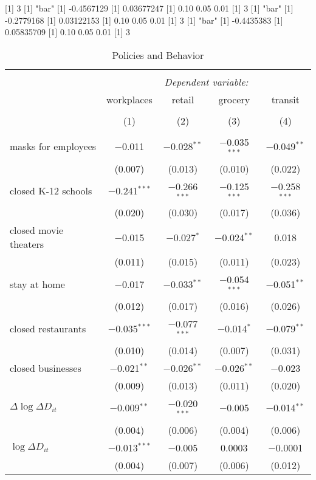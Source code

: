 [1] 3
[1] "bar"
[1] -0.4567129
[1] 0.03677247
[1] 0.10 0.05 0.01
[1] 3
[1] "bar"
[1] -0.2779168
[1] 0.03122153
[1] 0.10 0.05 0.01
[1] 3
[1] "bar"
[1] -0.4435383
[1] 0.05835709
[1] 0.10 0.05 0.01
[1] 3

\begin{table}[!htbp] \centering 
  \caption{Policies and Behavior} 
  \label{} 
\begin{tabular}{@{\extracolsep{1pt}}lcccc} 
\\[-1.8ex]\hline 
\hline \\[-1.8ex] 
 & \multicolumn{4}{c}{\textit{Dependent variable:}} \\ 
\cline{2-5} 
 & workplaces & retail & grocery & transit \\ 
\\[-1.8ex] & (1) & (2) & (3) & (4)\\ 
\hline \\[-1.8ex] 
 masks for employees & $-$0.011 & $-$0.028$^{**}$ & $-$0.035$^{***}$ & $-$0.049$^{**}$ \\ 
  & (0.007) & (0.013) & (0.010) & (0.022) \\ 
  closed K-12 schools & $-$0.241$^{***}$ & $-$0.266$^{***}$ & $-$0.125$^{***}$ & $-$0.258$^{***}$ \\ 
  & (0.020) & (0.030) & (0.017) & (0.036) \\ 
  closed movie theaters & $-$0.015 & $-$0.027$^{*}$ & $-$0.024$^{**}$ & 0.018 \\ 
  & (0.011) & (0.015) & (0.011) & (0.023) \\ 
  stay at home & $-$0.017 & $-$0.033$^{**}$ & $-$0.054$^{***}$ & $-$0.051$^{**}$ \\ 
  & (0.012) & (0.017) & (0.016) & (0.026) \\ 
  closed restaurants & $-$0.035$^{***}$ & $-$0.077$^{***}$ & $-$0.014$^{*}$ & $-$0.079$^{**}$ \\ 
  & (0.010) & (0.014) & (0.007) & (0.031) \\ 
  closed businesses & $-$0.021$^{**}$ & $-$0.026$^{**}$ & $-$0.026$^{**}$ & $-$0.023 \\ 
  & (0.009) & (0.013) & (0.011) & (0.020) \\ 
  $\Delta \log \Delta D_{it}$ & $-$0.009$^{**}$ & $-$0.020$^{***}$ & $-$0.005 & $-$0.014$^{**}$ \\ 
  & (0.004) & (0.006) & (0.004) & (0.006) \\ 
  $\log \Delta D_{it}$ & $-$0.013$^{***}$ & $-$0.005 & 0.0003 & $-$0.0001 \\ 
  & (0.004) & (0.007) & (0.006) & (0.012) \\ 

\end{tabular}
\end{table}
